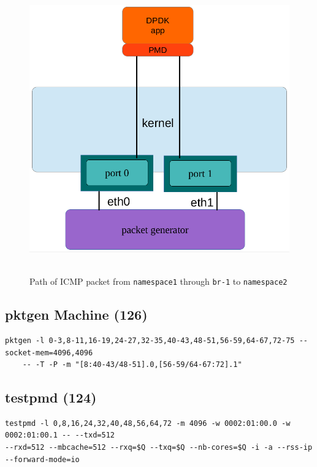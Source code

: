 \documentclass[letter]{article}
\begin{document}
{{\begin{figure}[H]
\caption{Path of ICMP packet from \texttt{namespace1} through \texttt{br-1} to \texttt{namespace2}}
\hbox{\hspace{-0.5cm} \includegraphics[scale=0.6]{i-o-2-ports} }
\end{figure}

\subsection{pktgen Machine (126)}

\begin{lstlisting}
pktgen -l 0-3,8-11,16-19,24-27,32-35,40-43,48-51,56-59,64-67,72-75 --socket-mem=4096,4096 
	-- -T -P -m "[8:40-43/48-51].0,[56-59/64-67:72].1"
\end{lstlisting}

\subsection{testpmd (124)}

\begin{lstlisting}[escapechar=!]
testpmd -l 0,8,16,24,32,40,48,56,64,72 -m 4096 -w 0002:01:00.0 -w 0002:01:00.1 -- --txd=512
--rxd=512 --mbcache=512 --rxq=$Q --txq=$Q --nb-cores=$Q -i -a --rss-ip --forward-mode=io
\end{lstlisting}

}}
\end{document}
